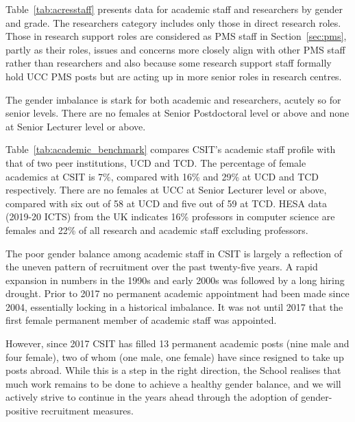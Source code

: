 Table~\ref{tab:acresstaff} presents data for academic staff and researchers
by gender and grade. The researchers category includes only those in direct 
research roles. Those in research support roles are considered as PMS staff
in Section~\ref{sec:pms}, partly as their roles, issues and concerns more 
closely align with other PMS staff rather than researchers and also because
some research support staff formally hold UCC PMS posts but are acting up 
in more senior roles in research centres. 



The gender imbalance is stark for both academic and researchers, 
acutely so for senior levels. There are no females at Senior Postdoctoral 
level or above  and none at Senior Lecturer level or above. 

Table~\ref{tab:academic_benchmark} compares CSIT's academic
staff profile with that of two peer institutions, \ac{UCD} and 
\ac{TCD}.
The percentage of female academics at CSIT is 7\%, 
compared with 16\% and 29\% at UCD and TCD 
respectively. There are no females at UCC at Senior Lecturer
level or above, compared with six out of 58 at UCD and five 
out of 59 at TCD. \ac{HESA} data  (2019-20 ICTS) from the 
UK indicates 16\% professors in computer science are females 
and 22\% of all research and academic staff excluding professors.





The poor gender balance among academic staff in CSIT is largely 
a reflection of the uneven pattern of recruitment over the past 
twenty-five years. 
A rapid expansion in numbers in the 1990s and early 2000s was
followed by a long hiring drought. Prior to 2017 no permanent
academic appointment had been made since 2004, essentially 
locking in a historical imbalance. It was not until 2017 that
the first female permanent member of academic staff was appointed.

However, since 2017 CSIT has filled 13 permanent academic posts 
(nine male and four female), two of whom (one male, one female)
have since resigned to take up posts abroad.
While this is a step in the right direction, the School realises that 
much work remains to be done to achieve a healthy gender balance, and
we will actively strive to continue in
the years ahead through the adoption of gender-positive recruitment
measures. 


